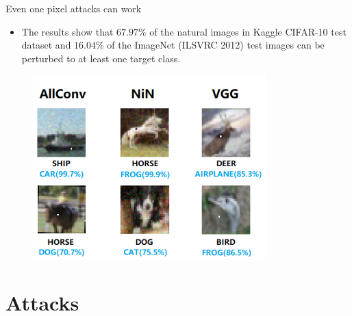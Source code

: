 \documentclass{beamer}
\begin{document}
\begin{frame}{Even one pixel attacks can work}
    \begin{itemize}
        \item The results show that $67.97\%$ of the natural images in Kaggle CIFAR-10 test dataset and $16.04\%$ of the ImageNet (ILSVRC 2012) test images can be perturbed to at least one target class.
    \end{itemize}
    \begin{figure}
    \centering
    \includegraphics[width=0.6\linewidth]{images/one_pixel_attack.PNG}
    \caption{\cite{su2019one}}
    \end{figure}
\end{frame}


\section{Attacks}
\end{document}
